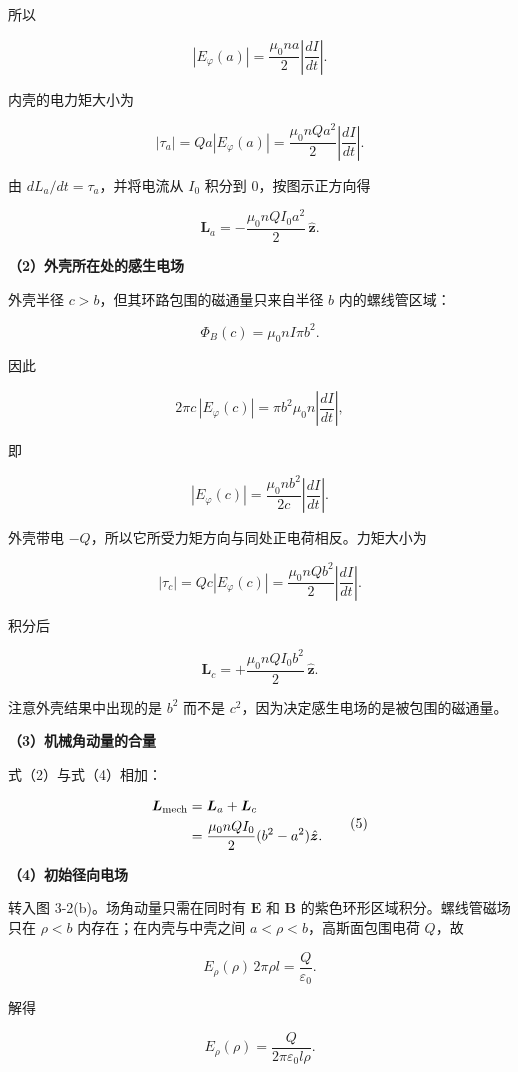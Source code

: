 \documentclass[12pt,a4paper,UTF8]{ctexart}
\begin{document}
所以

\[
|E_\varphi(a)|
=\frac{\mu_0na}{2}
\left|\frac{dI}{dt}\right|.\tag{1}
\]

内壳的电力矩大小为

\[
|\tau_a|=Qa|E_\varphi(a)|
=\frac{\mu_0nQa^2}{2}
\left|\frac{dI}{dt}\right|.
\]

由 \(dL_a/dt=\tau_a\)，并将电流从 \(I_0\) 积分到 \(0\)，按图示正方向得

\[
\boxed{
\bm L_a=-\frac{\mu_0nQI_0a^2}{2}\,\hat{\bm z}
}.\tag{2}
\]

\textbf{（2）外壳所在处的感生电场}

外壳半径 \(c>b\)，但其环路包围的磁通量只来自半径 \(b\) 内的螺线管区域：

\[
\Phi_B(c)=\mu_0nI\pi b^2.
\]

因此

\[
2\pi c\,|E_\varphi(c)|
=\pi b^2\mu_0n\left|\frac{dI}{dt}\right|,
\]

即

\[
|E_\varphi(c)|
=\frac{\mu_0nb^2}{2c}
\left|\frac{dI}{dt}\right|.\tag{3}
\]

外壳带电 \(-Q\)，所以它所受力矩方向与同处正电荷相反。力矩大小为

\[
|\tau_c|
=Qc|E_\varphi(c)|
=\frac{\mu_0nQb^2}{2}
\left|\frac{dI}{dt}\right|.
\]

积分后

\[
\boxed{
\bm L_c=+\frac{\mu_0nQI_0b^2}{2}\,\hat{\bm z}
}.\tag{4}
\]

注意外壳结果中出现的是 \(b^2\) 而不是
\(c^2\)，因为决定感生电场的是被包围的磁通量。

\textbf{（3）机械角动量的合量}

式（2）与式（4）相加：

\[
\begin{aligned}
\bm L_{\rm mech}
&=\bm L_a+\bm L_c\\
&=\frac{\mu_0nQI_0}{2}(b^2-a^2)\hat{\bm z}.
\end{aligned}\tag{5}
\]

\textbf{（4）初始径向电场}

转入图 3-2(b)。场角动量只需在同时有 \(\bm E\) 和 \(\bm B\)
的紫色环形区域积分。螺线管磁场只在 \(\rho<b\) 内存在；在内壳与中壳之间
\(a<\rho<b\)，高斯面包围电荷 \(Q\)，故

\[
E_\rho(\rho)\,2\pi\rho l=\frac{Q}{\varepsilon_0}.
\]

解得

\[
E_\rho(\rho)=\frac{Q}{2\pi\varepsilon_0l\rho}.\tag{6}
\]
\end{document}
